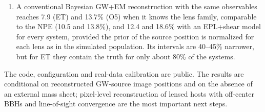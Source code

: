 \begin{enumerate}
\item A conventional Bayesian GW+EM reconstruction with the same observables reaches 7.9 (ET) and 13.7\% (O5) when it knows the lens family, comparable to the NPE (10.5 and 13.8\%), and 12.4 and 18.6\% with an EPL+shear model for every system, provided the prior of the source position is normalized for each lens as in the simulated population. Its intervals are 40--45\% narrower, but for ET they contain the truth for only about 80\% of the systems.
\end{enumerate}
The code, configuration and real-data calibration are public. The results are conditional on reconstructed GW-source image positions and on the absence of an external mass sheet; pixel-level reconstruction of lensed hosts with off-center BBHs and line-of-sight convergence are the most important next steps.
